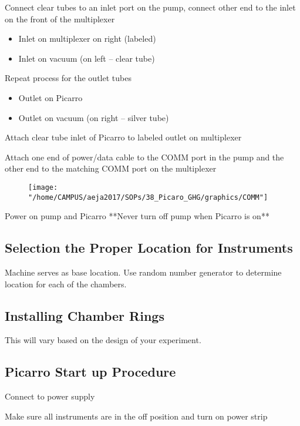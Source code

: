 \documentclass[12pt]{../SOP3}\usepackage[]{graphicx}\usepackage[]{color}
\begin{document}
\NP Connect clear tubes to an inlet port on the pump, connect other end to the inlet on the front of the multiplexer
\begin{itemize}
\item Inlet on multiplexer on right (labeled)
\item Inlet on vacuum (on left -- clear tube)
\end{itemize}



\NP Repeat process for the outlet tubes
\begin{itemize}
\item Outlet on Picarro
\item Outlet on vacuum (on right -- silver tube)
\end{itemize}

\NP Attach clear tube inlet of Picarro to labeled outlet on multiplexer

\NP Attach one end of power/data cable to the COMM port in the pump and the other end to the matching COMM port on the multiplexer

\begin{figure}
\texttt{[image: "/home/CAMPUS/aeja2017/SOPs/38\_Picaro\_GHG/graphics/COMM"]}
\end{figure}

\NP Power on pump and Picarro **Never turn off pump when Picarro is on**

\subsection*{Selection the Proper Location for Instruments}

\NP Machine serves as base location.
\NP Use random number generator to determine location for each of the chambers.

\subsection*{Installing Chamber Rings}

\NP This will vary based on the design of your experiment. 

\subsection*{Picarro Start up Procedure}

\NP Connect to power supply

\NP Make sure all instruments are in the off position and turn on power strip
\end{document}
